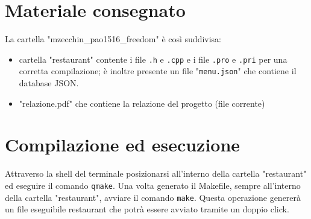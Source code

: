 \documentclass[]{report}   %
\begin{document}
\section{Materiale consegnato}     		%
La cartella "mzecchin\_pao1516\_freedom" è così suddivisa:
\begin{itemize}
\item cartella "restaurant" contente i file \texttt{.h} e \texttt{.cpp} e i file \texttt{.pro} e \texttt{.pri} per una corretta compilazione; è inoltre presente un file "\texttt{menu.json}" che contiene il database JSON.
\item "relazione.pdf" che contiene la relazione del progetto (file corrente)
\end{itemize}

\section{Compilazione ed esecuzione}	%
Attraverso la shell del terminale posizionarsi all'interno della cartella "restaurant" ed eseguire il comando \texttt{qmake}. Una volta generato il Makefile, sempre all'interno della cartella "restaurant", avviare il comando \texttt{make}. Questa operazione genererà un file eseguibile restaurant che potrà essere avviato tramite un doppio click.
\end{document}
